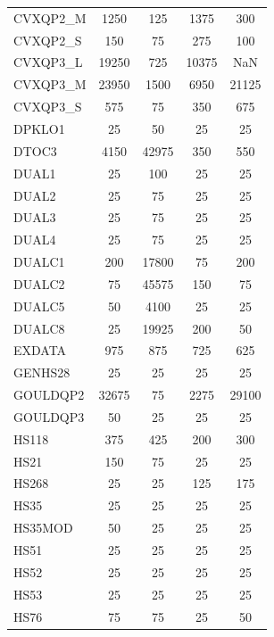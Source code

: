 \begin{longtable}{lcccc}
CVXQP2\_M &     1250 &   125 &     1375 &      300 \\
CVXQP2\_S &      150 &    75 &      275 &      100 \\
CVXQP3\_L &    19250 &   725 &    10375 &      NaN \\
CVXQP3\_M &    23950 &  1500 &     6950 &    21125 \\
CVXQP3\_S &      575 &    75 &      350 &      675 \\
DPKLO1   &       25 &    50 &       25 &       25 \\
DTOC3    &     4150 & 42975 &      350 &      550 \\
DUAL1    &       25 &   100 &       25 &       25 \\
DUAL2    &       25 &    75 &       25 &       25 \\
DUAL3    &       25 &    75 &       25 &       25 \\
DUAL4    &       25 &    75 &       25 &       25 \\
DUALC1   &      200 & 17800 &       75 &      200 \\
DUALC2   &       75 & 45575 &      150 &       75 \\
DUALC5   &       50 &  4100 &       25 &       25 \\
DUALC8   &       25 & 19925 &      200 &       50 \\
EXDATA   &      975 &   875 &      725 &      625 \\
GENHS28  &       25 &    25 &       25 &       25 \\
GOULDQP2 &    32675 &    75 &     2275 &    29100 \\
GOULDQP3 &       50 &    25 &       25 &       25 \\
HS118    &      375 &   425 &      200 &      300 \\
HS21     &      150 &    75 &       25 &       25 \\
HS268    &       25 &    25 &      125 &      175 \\
HS35     &       25 &    25 &       25 &       25 \\
HS35MOD  &       50 &    25 &       25 &       25 \\
HS51     &       25 &    25 &       25 &       25 \\
HS52     &       25 &    25 &       25 &       25 \\
HS53     &       25 &    25 &       25 &       25 \\
HS76     &       75 &    75 &       25 &       50 \\

\end{longtable}
